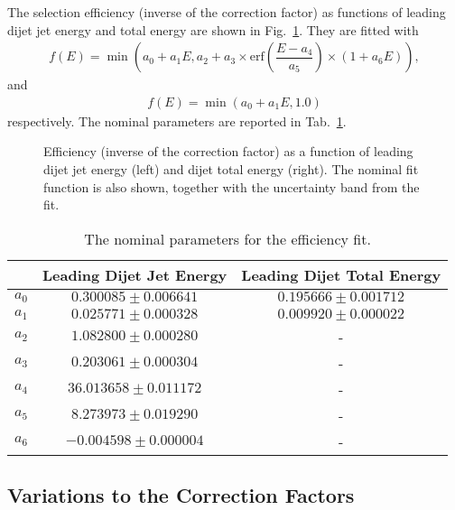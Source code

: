 The selection efficiency (inverse of the correction factor) as functions of leading dijet jet energy and total energy are shown in Fig.~\ref{Figure:LeadingJet-HybridECorrection}.  They are fitted with
%
\begin{align}
    f(E) = \min\left(a_0 + a_1 E, a_2 + a_3 \times  \text{erf}\left(\dfrac{E - a_4}{a_5}\right) \times  (1+a_6 E)\right),
\end{align}
%
and
%
\begin{align}
    f(E) = \min(a_0 + a_1 E, 1.0)
\end{align}
%
respectively.  The nominal parameters are reported in Tab.~\ref{Table:LeadingJet-HybridECorrection}.


\begin{figure}[htp!]
    \centering
    \caption{Efficiency (inverse of the correction factor) as a function of leading dijet jet energy (left) and dijet total energy (right).  The nominal fit function is also shown, together with the uncertainty band from the fit.}
    \label{Figure:LeadingJet-HybridECorrection}
\end{figure}

\begin{table}[htp!]
    \centering
    \begin{tabular}{|c|c|c|}
        \hline
 & Leading Dijet Jet Energy & Leading Dijet Total Energy \\\hline
$a_0$ & $0.300085 \pm 0.006641$ & $0.195666 \pm 0.001712$ \\\hline
$a_1$ & $0.025771 \pm 0.000328$ & $0.009920 \pm 0.000022$ \\\hline
$a_2$ & $1.082800 \pm 0.000280$ & - \\\hline
$a_3$ & $0.203061 \pm 0.000304$ & - \\\hline
$a_4$ & $36.013658 \pm 0.011172$ & - \\\hline
$a_5$ & $8.273973 \pm 0.019290$ & - \\\hline
$a_6$ & $-0.004598 \pm 0.000004$ & - \\\hline
    \end{tabular}
    \caption{The nominal parameters for the efficiency fit.}
    \label{Table:LeadingJet-HybridECorrection}
\end{table}

\subsection{Variations to the Correction Factors}\label{Subsection:LeadingJetCorrectionVariation}

